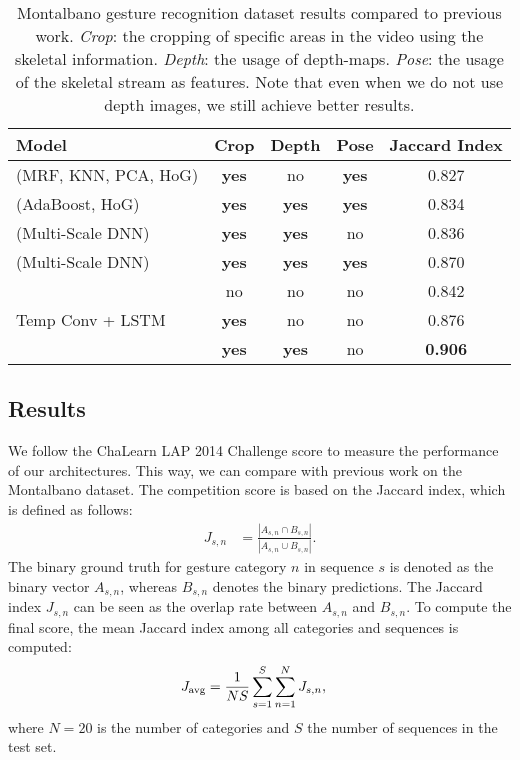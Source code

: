 \documentclass[11pt,a4paper]{article} \usepackage{a4wide}
\begin{document}
\begin{table}[bt]
\begin{center}
\begin{tabular}{lcccc}
\toprule
\multicolumn{1}{l}{\bf Model} &\multicolumn{1}{c}{\bf Crop} &\multicolumn{1}{c}{\bf Depth} &\multicolumn{1}{c}{\bf Pose} &\multicolumn{1}{c}{\bf Jaccard Index} \\ 
\midrule
\cite{chang2014nonparametric} (MRF, KNN, PCA, HoG) &\textbf{yes} &no &\textbf{yes} 	&0.827 \\
\cite{monnier2014multi} (AdaBoost, HoG) &\textbf{yes} &\textbf{yes} &\textbf{yes} 	&0.834 \\
\cite{neverova2014moddrop} (Multi-Scale DNN)  &\textbf{yes} &\textbf{yes} &no 	&0.836 \\
\cite{neverova2014moddrop} (Multi-Scale DNN)  &\textbf{yes} &\textbf{yes} &\textbf{yes} 	&0.870 \\
\midrule 
 										&no &no &no 	&0.842 \\
Temp Conv + LSTM 										&\textbf{yes} &no &no 	&0.876 \\
  										&\textbf{yes} &\textbf{yes} &no 	&\textbf{0.906} \\	
\bottomrule
\end{tabular}
\end{center}
\caption{Montalbano gesture recognition dataset results compared to previous work. \emph{Crop}: the cropping of specific areas in the video using the skeletal information. \emph{Depth}: the usage of depth-maps. \emph{Pose}: the usage of the skeletal stream as features. 
Note that even when we do not use depth images, we still achieve better results.\\}
\label{tab:sota}
\end{table}



\subsection{Results} \label{sec:results}

We follow the ChaLearn LAP 2014 Challenge score to measure the performance of our architectures. This way, we can compare with previous work on the Montalbano dataset. The competition score is based on the Jaccard index, which is defined as follows:
\begin{align}
J_{s,n} &= \frac{|A_{s,n} \cap B_{s,n} |}{|A_{s,n} \cup B_{s,n}|}.
\end{align}
The binary ground truth for gesture category $n$ in sequence $s$ is denoted as the binary vector $A_{s,n}$, whereas $B_{s,n}$ denotes the binary predictions. The Jaccard index $J_{s,n}$ can be seen as the overlap rate between $A_{s,n}$ and $B_{s,n}$. To compute the final score, the mean Jaccard index among all categories and sequences is computed:
\begin{align}
J_{\textnormal{avg}} &= \frac{1}{N S}\sum_{s=1}^{S} \sum_{n=1}^{N} J_{s,n},
\end{align}
where $N=20$ is the number of categories and $S$ the number of sequences in the test set. 
\end{document}
